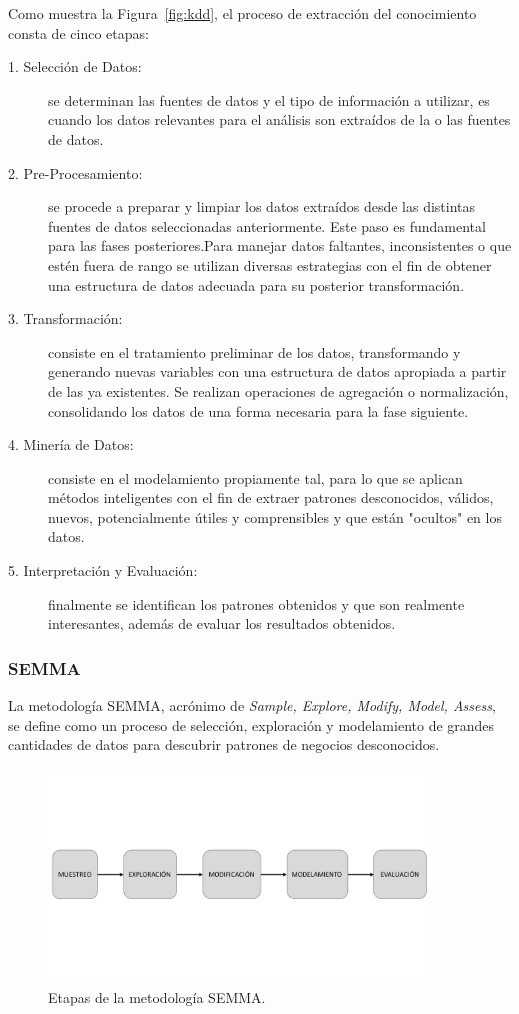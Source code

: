 Como muestra la Figura~\ref{fig:kdd}, el proceso de extracción del conocimiento consta de cinco etapas:
\begin{description}
  \item[1. Selección de Datos:] se determinan las fuentes de datos y el tipo de información a utilizar, es cuando los datos relevantes para el análisis son extraídos de la o las fuentes de datos.
  \item[2. Pre-Procesamiento:] se procede a preparar y limpiar los datos extraídos desde las distintas fuentes de datos seleccionadas anteriormente. Este paso es fundamental para las fases posteriores.Para manejar datos faltantes, inconsistentes o que estén fuera de rango se utilizan diversas estrategias con el fin de obtener una estructura de datos adecuada para su posterior transformación.
  \item[3. Transformación:] consiste en el tratamiento preliminar de los datos, transformando y generando nuevas variables con una estructura de datos apropiada a partir de las ya existentes. Se realizan operaciones de agregación o normalización, consolidando los datos de una forma necesaria para la fase siguiente. 
  \item[4. Minería de Datos:] consiste en el modelamiento propiamente tal, para lo que se aplican métodos inteligentes con el fin de extraer patrones desconocidos, válidos, nuevos, potencialmente útiles y comprensibles y que están "ocultos" en los datos.
  \item[5. Interpretación y Evaluación:] finalmente se identifican los patrones obtenidos y que son realmente interesantes, además de evaluar los resultados obtenidos.
\end{description}

\subsubsection{SEMMA}
La metodología SEMMA, acrónimo de \textit{Sample, Explore, Modify, Model, Assess}, se define como un proceso de selección, exploración y modelamiento de grandes cantidades de datos para descubrir patrones de negocios desconocidos. 

\begin{figure}[H]
  \centering
    \includegraphics[width=0.9\textwidth]{Figuras/SEMMA}
      \caption{Etapas de la metodología SEMMA.}
    \label{fig:semma}
\end{figure}

